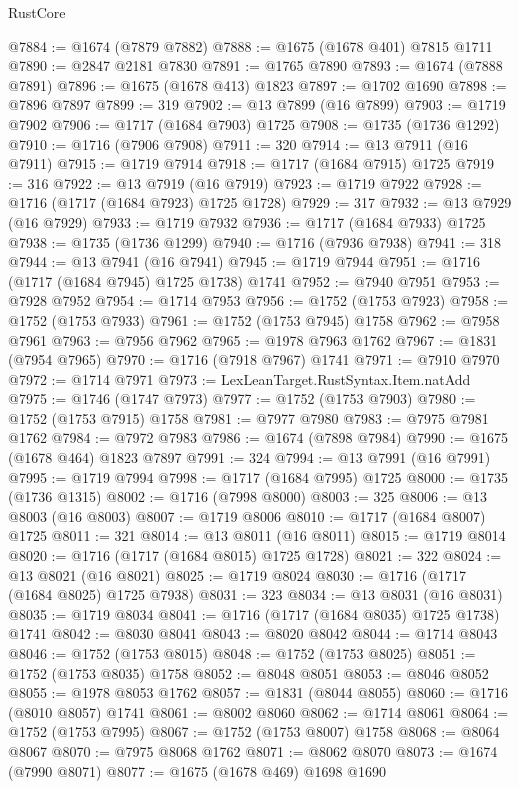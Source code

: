 \begin{lexlean}{RustCore}
\begin{coremodule}
@7884 := @1674 (@7879 @7882)
@7888 := @1675 (@1678 @401) @7815 @1711
@7890 := @2847 @2181 @7830
@7891 := @1765 @7890
@7893 := @1674 (@7888 @7891)
@7896 := @1675 (@1678 @413) @1823
@7897 := @1702 @1690
@7898 := @7896 @7897
@7899 := 319
@7902 := @13 @7899 (@16 @7899)
@7903 := @1719 @7902
@7906 := @1717 (@1684 @7903) @1725
@7908 := @1735 (@1736 @1292)
@7910 := @1716 (@7906 @7908)
@7911 := 320
@7914 := @13 @7911 (@16 @7911)
@7915 := @1719 @7914
@7918 := @1717 (@1684 @7915) @1725
@7919 := 316
@7922 := @13 @7919 (@16 @7919)
@7923 := @1719 @7922
@7928 := @1716 (@1717 (@1684 @7923) @1725 @1728)
@7929 := 317
@7932 := @13 @7929 (@16 @7929)
@7933 := @1719 @7932
@7936 := @1717 (@1684 @7933) @1725
@7938 := @1735 (@1736 @1299)
@7940 := @1716 (@7936 @7938)
@7941 := 318
@7944 := @13 @7941 (@16 @7941)
@7945 := @1719 @7944
@7951 := @1716 (@1717 (@1684 @7945) @1725 @1738) @1741
@7952 := @7940 @7951
@7953 := @7928 @7952
@7954 := @1714 @7953
@7956 := @1752 (@1753 @7923)
@7958 := @1752 (@1753 @7933)
@7961 := @1752 (@1753 @7945) @1758
@7962 := @7958 @7961
@7963 := @7956 @7962
@7965 := @1978 @7963 @1762
@7967 := @1831 (@7954 @7965)
@7970 := @1716 (@7918 @7967) @1741
@7971 := @7910 @7970
@7972 := @1714 @7971
@7973 := LexLeanTarget.RustSyntax.Item.natAdd
@7975 := @1746 (@1747 @7973)
@7977 := @1752 (@1753 @7903)
@7980 := @1752 (@1753 @7915) @1758
@7981 := @7977 @7980
@7983 := @7975 @7981 @1762
@7984 := @7972 @7983
@7986 := @1674 (@7898 @7984)
@7990 := @1675 (@1678 @464) @1823 @7897
@7991 := 324
@7994 := @13 @7991 (@16 @7991)
@7995 := @1719 @7994
@7998 := @1717 (@1684 @7995) @1725
@8000 := @1735 (@1736 @1315)
@8002 := @1716 (@7998 @8000)
@8003 := 325
@8006 := @13 @8003 (@16 @8003)
@8007 := @1719 @8006
@8010 := @1717 (@1684 @8007) @1725
@8011 := 321
@8014 := @13 @8011 (@16 @8011)
@8015 := @1719 @8014
@8020 := @1716 (@1717 (@1684 @8015) @1725 @1728)
@8021 := 322
@8024 := @13 @8021 (@16 @8021)
@8025 := @1719 @8024
@8030 := @1716 (@1717 (@1684 @8025) @1725 @7938)
@8031 := 323
@8034 := @13 @8031 (@16 @8031)
@8035 := @1719 @8034
@8041 := @1716 (@1717 (@1684 @8035) @1725 @1738) @1741
@8042 := @8030 @8041
@8043 := @8020 @8042
@8044 := @1714 @8043
@8046 := @1752 (@1753 @8015)
@8048 := @1752 (@1753 @8025)
@8051 := @1752 (@1753 @8035) @1758
@8052 := @8048 @8051
@8053 := @8046 @8052
@8055 := @1978 @8053 @1762
@8057 := @1831 (@8044 @8055)
@8060 := @1716 (@8010 @8057) @1741
@8061 := @8002 @8060
@8062 := @1714 @8061
@8064 := @1752 (@1753 @7995)
@8067 := @1752 (@1753 @8007) @1758
@8068 := @8064 @8067
@8070 := @7975 @8068 @1762
@8071 := @8062 @8070
@8073 := @1674 (@7990 @8071)
@8077 := @1675 (@1678 @469) @1698 @1690

\end{coremodule}
\end{lexlean}
